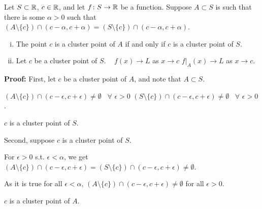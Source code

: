 \documentclass[10pt,aspectratio=149]{beamer}
\begin{document}
\begin{frame}

\begin{proposition}
Let $S \subset {\mathbb{R}}$, $c \in {\mathbb{R}}$, and
let $f \colon S
\to {\mathbb{R}}$ be a function.
\pause
Suppose
$A \subset S$ is such that there is some $\alpha > 0$ such that
$(A \setminus \{ c \}) \cap (c-\alpha,c+\alpha) = (S \setminus \{ c \}) \cap (c-\alpha,c+\alpha)$.
\pause
\begin{enumerate}[(i)]
\item
The point $c$ is a cluster point of $A$ if and only if $c$ is a cluster point
of $S$.
\item\pause
Let $c$ be a cluster point of $S$. ~ $f(x) \to L$ as $x \to c$
\wiffif
$f|_A(x) \to L$ as $x \to c$.
\end{enumerate}
\end{proposition}

\pause
\textbf{Proof:}
First, let $c$ be a cluster point of $A$, and note that $A \subset S$.

\pause
$( A \setminus \{ c\} ) \cap (c-\epsilon,c+\epsilon) \not= \emptyset$
~$\forall$ $\epsilon > 0$
\pause
\wthus
$( S \setminus \{ c\} ) \cap
(c-\epsilon,c+\epsilon) \not= \emptyset$
~$\forall$ $\epsilon > 0$.

\pause
\thus \quad $c$ is a cluster point of $S$.

\pause
\medskip

Second, suppose $c$ is a cluster point of $S$.

\pause
For $\epsilon > 0$ s.t.  $\epsilon < \alpha$, we get $( A \setminus \{ c\} ) \cap (c-\epsilon,c+\epsilon) =
( S \setminus \{ c\} ) \cap (c-\epsilon,c+\epsilon) \not= \emptyset$.

\pause
As it is true for all $\epsilon < \alpha$,
\quad
$( A \setminus \{ c\} ) \cap (c-\epsilon,c+\epsilon) \not=\emptyset$ for all
$\epsilon > 0$.

\pause
\thus \quad $c$ is a cluster point of $A$.

\end{frame}
\end{document}
